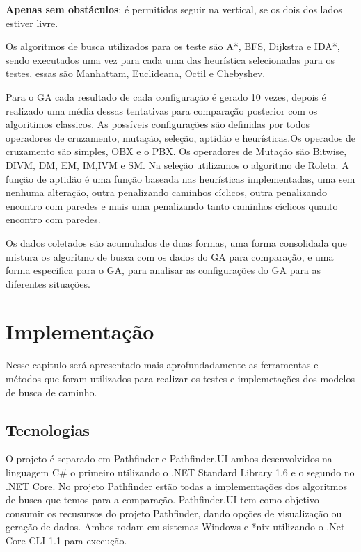 \textbf{Apenas sem obstáculos}: é permitidos seguir na vertical, se os dois dos lados estiver livre.

\begin{minipage}{\linewidth}
    \label{fig:d_noobstacle}
\end{minipage}


Os algoritmos de busca utilizados para os teste são A\**, BFS, Dijkstra e IDA\**, sendo executados uma vez para cada uma das heurística selecionadas para os testes, essas são Manhattam, Euclideana, Octil e Chebyshev.

Para o GA cada resultado de cada configuração é gerado 10 vezes, depois é realizado uma média dessas tentativas para comparação posterior com os algoritimos classicos. As possíveis configurações são definidas por todos operadores de cruzamento, mutação, seleção, aptidão e heurísticas.Os operados de cruzamento são simples, OBX e o PBX. Os operadores de Mutação são Bitwise, DIVM, DM, EM, IM,IVM e SM. Na seleção utilizamos o algoritmo de Roleta. A função de aptidão é uma função baseada nas heurísticas implementadas, uma sem nenhuma alteração, outra penalizando caminhos cíclicos, outra penalizando encontro com paredes e mais uma penalizando tanto caminhos cíclicos quanto encontro com paredes.

Os dados coletados são acumulados de duas formas, uma forma consolidada que mistura os algoritmo de busca com os dados do GA para comparação, e uma forma especifica para o GA, para analisar as configurações do GA para as diferentes situações.

\chapter[Implementação]{Implementação}

Nesse capitulo será apresentado mais aprofundadamente as ferramentas e métodos que foram utilizados para realizar os testes  e implemetações dos modelos de busca de caminho.

\section{Tecnologias}
O projeto é separado em Pathfinder e Pathfinder.UI ambos desenvolvidos na linguagem C\# o primeiro utilizando o .NET Standard Library 1.6 e o segundo no .NET Core. No projeto Pathfinder estão todas a  implementações dos algoritmos de busca que temos para a comparação. Pathfinder.UI tem como objetivo consumir os recusursos do projeto Pathfinder, dando opções de visualização ou geração de dados. Ambos rodam em sistemas Windows e \**nix utilizando o .Net Core CLI 1.1 para execução.

